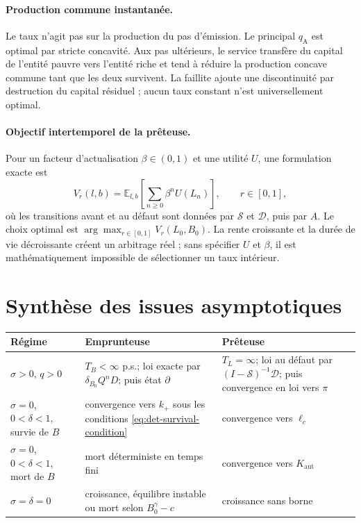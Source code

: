 \documentclass[11pt,a4paper]{article}
\newcommand{\E}{\mathbb E}
\newcommand{\1}{\mathbf 1}
\theoremstyle{definition}
\theoremstyle{remark}
\begin{document}
\paragraph{Production commune instantanée.}
Le taux n'agit pas sur la production du pas d'émission. Le principal
$q_{\mathrm A}$ est optimal par stricte concavité. Aux pas ultérieurs, le
service transfère du capital de l'entité pauvre vers l'entité riche et
tend à réduire la production concave commune tant que les deux survivent.
La faillite ajoute une discontinuité par destruction du capital résiduel ;
aucun taux constant n'est universellement optimal.

\paragraph{Objectif intertemporel de la prêteuse.}
Pour un facteur d'actualisation $\beta\in(0,1)$ et une utilité $U$, une
formulation exacte est
\begin{equation}
V_r(l,b)=\E_{l,b}\left[\sum_{n\geq0}\beta^nU(L_n)\right],
\qquad r\in[0,1],
\label{eq:bellman-objective}
\end{equation}
où les transitions avant et au défaut sont données par
$\mathcal S$ et $\mathcal D$, puis par $A$. Le choix optimal est
$\arg\max_{r\in[0,1]}V_r(L_0,B_0)$. La rente croissante et la durée de
vie décroissante créent un arbitrage réel ; sans spécifier $U$ et $\beta$,
il est mathématiquement impossible de sélectionner un taux intérieur.

\section{Synthèse des issues asymptotiques}

\begin{center}
\begin{tabularx}{\textwidth}{@{}lXX@{}}
\toprule
Régime & Emprunteuse & Prêteuse \\
\midrule
$\sigma>0$, $q>0$
& $T_B<\infty$ p.s.; loi exacte par
$\delta_{B_0}Q^nD$; puis état $\partial$
& $T_L=\infty$; loi au défaut par
$(I-\mathcal S)^{-1}\mathcal D$; puis convergence en loi vers $\pi$ \\
\addlinespace
$\sigma=0$, $0<\delta<1$, survie de $B$
& convergence vers $k_+$ sous les conditions
\eqref{eq:det-survival-condition}
& convergence vers $\ell_c$ \\
\addlinespace
$\sigma=0$, $0<\delta<1$, mort de $B$
& mort déterministe en temps fini
& convergence vers $K_{\mathrm{aut}}$ \\
\addlinespace
$\sigma=\delta=0$
& croissance, équilibre instable ou mort selon $B_0^\gamma-c$
& croissance sans borne \\
\bottomrule
\end{tabularx}
\end{center}
\end{document}
